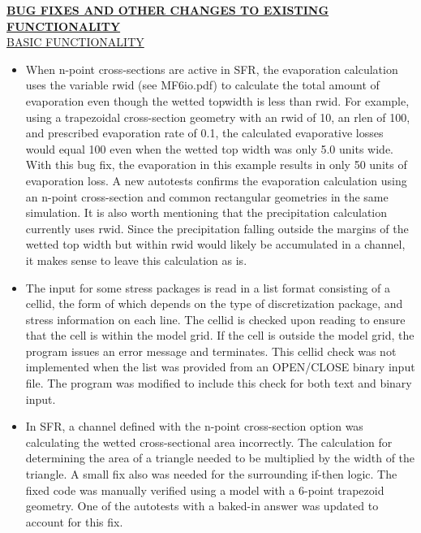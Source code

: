 
	\textbf{\underline{BUG FIXES AND OTHER CHANGES TO EXISTING FUNCTIONALITY}} \\
	\underline{BASIC FUNCTIONALITY}
	\begin{itemize}
		\item When n-point cross-sections are active in SFR, the evaporation calculation uses the variable rwid (see MF6io.pdf) to calculate the total amount of evaporation even though the wetted topwidth is less than rwid.  For example, using a trapezoidal cross-section geometry with an rwid of 10, an rlen of 100, and prescribed evaporation rate of 0.1, the calculated evaporative losses would equal 100 even when the wetted top width was only 5.0 units wide.  With this bug fix, the evaporation in this example results in only 50 units of evaporation loss.  A new autotests confirms the evaporation calculation using an n-point cross-section and common rectangular geometries in the same simulation.  It is also worth mentioning that the precipitation calculation currently uses rwid.  Since the precipitation falling outside the margins of the wetted top width but within rwid would likely be accumulated in a channel, it makes sense to leave this calculation as is.
		\item The input for some stress packages is read in a list format consisting of a cellid, the form of which depends on the type of discretization package, and stress information on each line.  The cellid is checked upon reading to ensure that the cell is within the model grid.  If the cell is outside the model grid, the program issues an error message and terminates.  This cellid check was not implemented when the list was provided from an OPEN/CLOSE binary input file.  The program was modified to include this check for both text and binary input.
		\item In SFR, a channel defined with the n-point cross-section option was calculating the wetted cross-sectional area incorrectly. The calculation for determining the area of a triangle needed to be multiplied by the width of the triangle.  A small fix also was needed for the surrounding if-then logic.  The fixed code was manually verified using a model with a 6-point trapezoid geometry.  One of the autotests with a baked-in answer was updated to account for this fix.

	\end{itemize}

